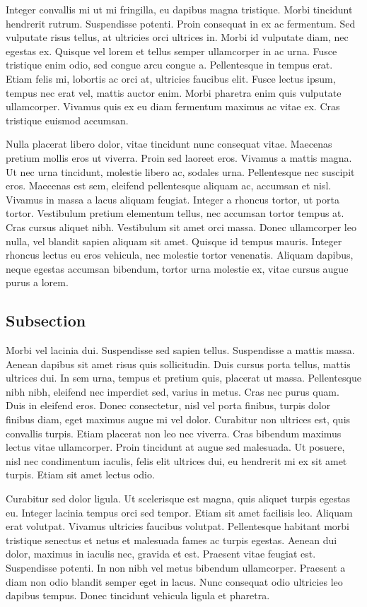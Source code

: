 Integer convallis mi ut mi fringilla, eu dapibus magna tristique. Morbi tincidunt hendrerit rutrum. Suspendisse potenti. Proin consequat in ex ac fermentum. Sed vulputate risus tellus, at ultricies orci ultrices in. Morbi id vulputate diam, nec egestas ex. Quisque vel lorem et tellus semper ullamcorper in ac urna. Fusce tristique enim odio, sed congue arcu congue a. Pellentesque in tempus erat. Etiam felis mi, lobortis ac orci at, ultricies faucibus elit. Fusce lectus ipsum, tempus nec erat vel, mattis auctor enim. Morbi pharetra enim quis vulputate ullamcorper. Vivamus quis ex eu diam fermentum maximus ac vitae ex. Cras tristique euismod accumsan.

Nulla placerat libero dolor, vitae tincidunt nunc consequat vitae. Maecenas pretium mollis eros ut viverra. Proin sed laoreet eros. Vivamus a mattis magna. Ut nec urna tincidunt, molestie libero ac, sodales urna. Pellentesque nec suscipit eros. Maecenas est sem, eleifend pellentesque aliquam ac, accumsan et nisl. Vivamus in massa a lacus aliquam feugiat. Integer a rhoncus tortor, ut porta tortor. Vestibulum pretium elementum tellus, nec accumsan tortor tempus at. Cras cursus aliquet nibh. Vestibulum sit amet orci massa. Donec ullamcorper leo nulla, vel blandit sapien aliquam sit amet. Quisque id tempus mauris. Integer rhoncus lectus eu eros vehicula, nec molestie tortor venenatis. Aliquam dapibus, neque egestas accumsan bibendum, tortor urna molestie ex, vitae cursus augue purus a lorem.

\subsection*{Subsection}
Morbi vel lacinia dui. Suspendisse sed sapien tellus. Suspendisse a mattis massa. Aenean dapibus sit amet risus quis sollicitudin. Duis cursus porta tellus, mattis ultrices dui. In sem urna, tempus et pretium quis, placerat ut massa. Pellentesque nibh nibh, eleifend nec imperdiet sed, varius in metus. Cras nec purus quam. Duis in eleifend eros. Donec consectetur, nisl vel porta finibus, turpis dolor finibus diam, eget maximus augue mi vel dolor. Curabitur non ultrices est, quis convallis turpis. Etiam placerat non leo nec viverra. Cras bibendum maximus lectus vitae ullamcorper. Proin tincidunt at augue sed malesuada. Ut posuere, nisl nec condimentum iaculis, felis elit ultrices dui, eu hendrerit mi ex sit amet turpis. Etiam sit amet lectus odio.

Curabitur sed dolor ligula. Ut scelerisque est magna, quis aliquet turpis egestas eu. Integer lacinia tempus orci sed tempor. Etiam sit amet facilisis leo. Aliquam erat volutpat. Vivamus ultricies faucibus volutpat. Pellentesque habitant morbi tristique senectus et netus et malesuada fames ac turpis egestas. Aenean dui dolor, maximus in iaculis nec, gravida et est. Praesent vitae feugiat est. Suspendisse potenti. In non nibh vel metus bibendum ullamcorper. Praesent a diam non odio blandit semper eget in lacus. Nunc consequat odio ultricies leo dapibus tempus. Donec tincidunt vehicula ligula et pharetra.

